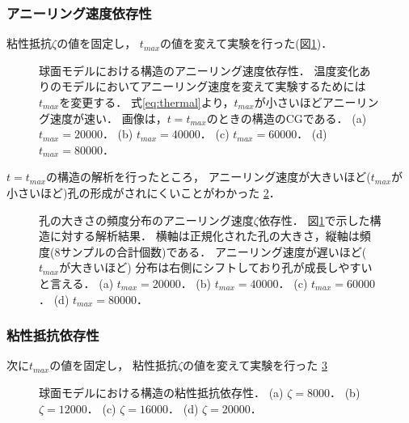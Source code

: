 \subsubsection{アニーリング速度依存性}

粘性抵抗$\zeta$の値を固定し，
$t_{max}$の値を変えて実験を行った(図\ref{fig:result_sphere_anearing_speed})．

\begin{figure}
\centering

\caption{
    球面モデルにおける構造のアニーリング速度依存性．
    温度変化ありのモデルにおいてアニーリング速度を変えて実験するためには$t_{max}$を変更する．
    式\ref{eq:thermal}より，$t_{max}$が小さいほどアニーリング速度が速い．
    画像は，$t=t_{max}$のときの構造のCGである．
    (a) $t_{max}=20000$．
    (b) $t_{max}=40000$．
    (c) $t_{max}=60000$．
    (d) $t_{max}=80000$．
}
\label{fig:result_sphere_anearing_speed}
\end{figure}

$t=t_{max}$の構造の解析を行ったところ，
アニーリング速度が大きいほど($t_{max}$が小さいほど)孔の形成がされにくいことがわかった
\ref{fig:result_sphere_anearing_speed_hist}．

\begin{figure}
\centering

\caption{
    孔の大きさの頻度分布のアニーリング速度$\zeta$依存性．
    図\ref{fig:result_sphere_anearing_speed}で示した構造に対する解析結果．
    横軸は正規化された孔の大きさ，縦軸は頻度(8サンプルの合計個数)である．
    アニーリング速度が遅いほど($t_{max}$が大きいほど)
    分布は右側にシフトしており孔が成長しやすいと言える．
    (a) $t_{max}=20000$．
    (b) $t_{max}=40000$．
    (c) $t_{max}=60000$．
    (d) $t_{max}=80000$．
}
\label{fig:result_sphere_anearing_speed_hist}
\end{figure}

\subsubsection{粘性抵抗依存性}

次に$t_{max}$の値を固定し，
粘性抵抗$\zeta$の値を変えて実験を行った
\ref{fig:result_sphere_friction_constant}

\begin{figure}
\centering

\caption{
    球面モデルにおける構造の粘性抵抗依存性．
    (a) $\zeta=8000$．
    (b) $\zeta=12000$．
    (c) $\zeta=16000$．
    (d) $\zeta=20000$．
}
\label{fig:result_sphere_friction_constant}
\end{figure}

